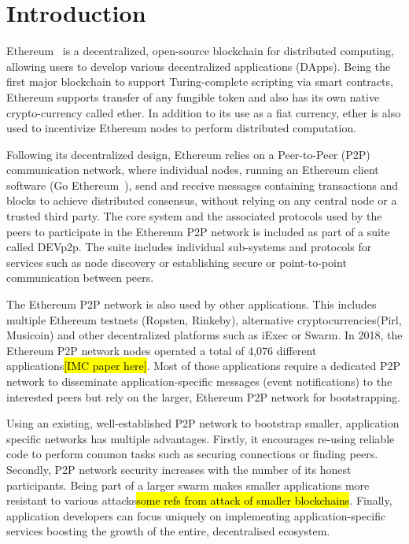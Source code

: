 
\section{Introduction}

Ethereum~\cite{} is a decentralized, open-source blockchain for distributed computing, allowing users to develop various decentralized applications (DApps). Being the first major blockchain to support Turing-complete scripting via smart contracts, Ethereum supports transfer of any fungible token and also has its own native crypto-currency called ether. In addition to its use as a fiat currency,  ether is also used to incentivize Ethereum nodes to perform distributed computation. 

Following its decentralized design, Ethereum relies on a Peer-to-Peer (P2P) communication network, where individual nodes, running an Ethereum client software (\eg Go Ethereum~\cite{go-ethereum}), send and receive messages containing transactions and blocks to achieve distributed consensus, without relying on any central node or a trusted third party. The core system and the associated protocols used by the peers to participate in the Ethereum P2P network is included as part of a suite called DEVp2p. The suite includes individual sub-systems and protocols for services such as node discovery or establishing secure or point-to-point communication between peers. 

The Ethereum P2P network is also used by other applications. This includes multiple Ethereum testnets (Ropsten, Rinkeby),  alternative cryptocurrencies(Pirl, Musicoin) and other decentralized platforms such as iExec or Swarm.
In 2018, the Ethereum P2P network nodes operated a total of 4,076 different applications\hl{[IMC paper here]}. Most of those applications require a dedicated P2P network to disseminate application-specific messages (\eg event notifications) to the interested peers but rely on the larger, Ethereum P2P network for bootstrapping.

Using an existing, well-established P2P network to bootstrap smaller, application specific networks has multiple advantages. Firstly, it encourages re-using reliable code to perform common tasks such as securing connections or finding peers. Secondly, P2P network security increases with the number of its honest participants. Being part of a larger swarm makes smaller applications more resistant to various attacks\hl{some refs from attack of smaller blockchains}. Finally, application developers can focus uniquely on implementing application-specific services boosting the growth of the entire, decentralised ecosystem. 


